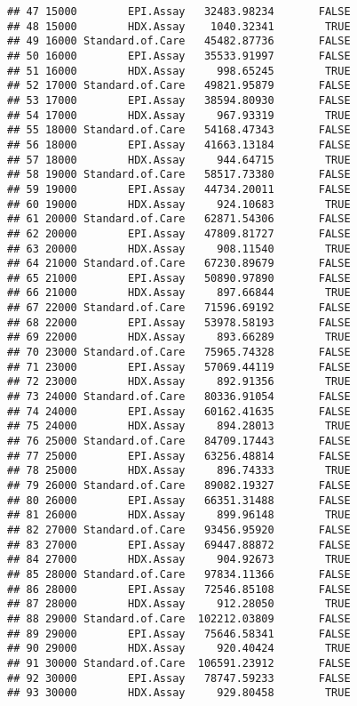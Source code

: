 \documentclass[
]{article}
\begin{document}
\begin{verbatim}
## 47 15000        EPI.Assay   32483.98234       FALSE
## 48 15000        HDX.Assay    1040.32341        TRUE
## 49 16000 Standard.of.Care   45482.87736       FALSE
## 50 16000        EPI.Assay   35533.91997       FALSE
## 51 16000        HDX.Assay     998.65245        TRUE
## 52 17000 Standard.of.Care   49821.95879       FALSE
## 53 17000        EPI.Assay   38594.80930       FALSE
## 54 17000        HDX.Assay     967.93319        TRUE
## 55 18000 Standard.of.Care   54168.47343       FALSE
## 56 18000        EPI.Assay   41663.13184       FALSE
## 57 18000        HDX.Assay     944.64715        TRUE
## 58 19000 Standard.of.Care   58517.73380       FALSE
## 59 19000        EPI.Assay   44734.20011       FALSE
## 60 19000        HDX.Assay     924.10683        TRUE
## 61 20000 Standard.of.Care   62871.54306       FALSE
## 62 20000        EPI.Assay   47809.81727       FALSE
## 63 20000        HDX.Assay     908.11540        TRUE
## 64 21000 Standard.of.Care   67230.89679       FALSE
## 65 21000        EPI.Assay   50890.97890       FALSE
## 66 21000        HDX.Assay     897.66844        TRUE
## 67 22000 Standard.of.Care   71596.69192       FALSE
## 68 22000        EPI.Assay   53978.58193       FALSE
## 69 22000        HDX.Assay     893.66289        TRUE
## 70 23000 Standard.of.Care   75965.74328       FALSE
## 71 23000        EPI.Assay   57069.44119       FALSE
## 72 23000        HDX.Assay     892.91356        TRUE
## 73 24000 Standard.of.Care   80336.91054       FALSE
## 74 24000        EPI.Assay   60162.41635       FALSE
## 75 24000        HDX.Assay     894.28013        TRUE
## 76 25000 Standard.of.Care   84709.17443       FALSE
## 77 25000        EPI.Assay   63256.48814       FALSE
## 78 25000        HDX.Assay     896.74333        TRUE
## 79 26000 Standard.of.Care   89082.19327       FALSE
## 80 26000        EPI.Assay   66351.31488       FALSE
## 81 26000        HDX.Assay     899.96148        TRUE
## 82 27000 Standard.of.Care   93456.95920       FALSE
## 83 27000        EPI.Assay   69447.88872       FALSE
## 84 27000        HDX.Assay     904.92673        TRUE
## 85 28000 Standard.of.Care   97834.11366       FALSE
## 86 28000        EPI.Assay   72546.85108       FALSE
## 87 28000        HDX.Assay     912.28050        TRUE
## 88 29000 Standard.of.Care  102212.03809       FALSE
## 89 29000        EPI.Assay   75646.58341       FALSE
## 90 29000        HDX.Assay     920.40424        TRUE
## 91 30000 Standard.of.Care  106591.23912       FALSE
## 92 30000        EPI.Assay   78747.59233       FALSE
## 93 30000        HDX.Assay     929.80458        TRUE
\end{verbatim}
\end{document}
